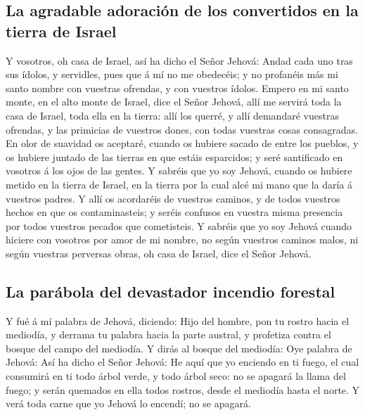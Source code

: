 \hypertarget{la-agradable-adoraciuxf3n-de-los-convertidos-en-la-tierra-de-israel}{%
\subsection{La agradable adoración de los convertidos en la tierra de
Israel}\label{la-agradable-adoraciuxf3n-de-los-convertidos-en-la-tierra-de-israel}}

 Y vosotros, oh casa de Israel, así ha dicho el Señor
Jehová: Andad cada uno tras sus ídolos, y servidles, pues que á mí no me
obedecéis; y no profanéis más mi santo nombre con vuestras ofrendas, y
con vuestros ídolos.  Empero en mi santo monte, en el alto
monte de Israel, dice el Señor Jehová, allí me servirá toda la casa de
Israel, toda ella en la tierra: allí los querré, y allí demandaré
vuestras ofrendas, y las primicias de vuestros dones, con todas vuestras
cosas consagradas.  En olor de suavidad os aceptaré, cuando
os hubiere sacado de entre los pueblos, y os hubiere juntado de las
tierras en que estáis esparcidos; y seré santificado en vosotros á los
ojos de las gentes.  Y sabréis que yo soy Jehová, cuando os
hubiere metido en la tierra de Israel, en la tierra por la cual alcé mi
mano que la daría á vuestros padres.  Y allí os acordaréis
de vuestros caminos, y de todos vuestros hechos en que os
contaminasteis; y seréis confusos en vuestra misma presencia por todos
vuestros pecados que cometisteis.  Y sabréis que yo soy
Jehová cuando hiciere con vosotros por amor de mi nombre, no según
vuestros caminos malos, ni según vuestras perversas obras, oh casa de
Israel, dice el Señor Jehová.

\hypertarget{la-paruxe1bola-del-devastador-incendio-forestal}{%
\subsection{La parábola del devastador incendio
forestal}\label{la-paruxe1bola-del-devastador-incendio-forestal}}

 Y fué á mí palabra de Jehová, diciendo:  Hijo
del hombre, pon tu rostro hacia el mediodía, y derrama tu palabra hacia
la parte austral, y profetiza contra el bosque del campo del mediodía.
 Y dirás al bosque del mediodía: Oye palabra de Jehová: Así
ha dicho el Señor Jehová: He aquí que yo enciendo en ti fuego, el cual
consumirá en ti todo árbol verde, y todo árbol seco: no se apagará la
llama del fuego; y serán quemados en ella todos rostros, desde el
mediodía hasta el norte.  Y verá toda carne que yo Jehová
lo encendí; no se apagará.

